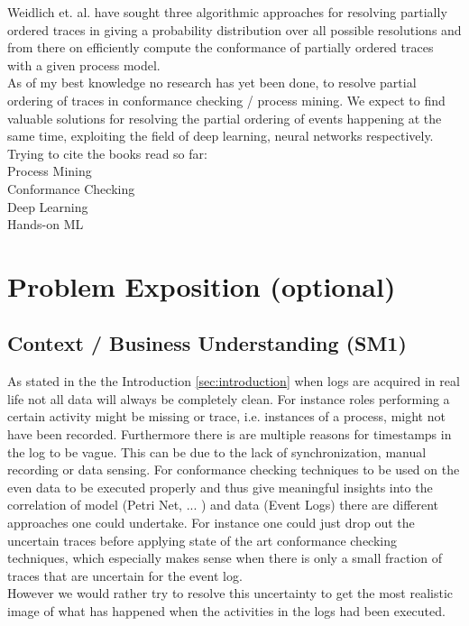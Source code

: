 \documentclass[
	a4paper,
	pagesize,
	pdftex,
	12pt,
	ngerman,
	fleqn,
	final,
	]{scrartcl}
\theoremstyle{plain}
\theoremstyle{definition}
\begin{document}
	Weidlich et. al. have sought three algorithmic approaches for resolving partially ordered traces in giving a probability distribution over all possible resolutions and from there on efficiently compute the conformance of partially ordered traces with a given process model.\cite{self} \\
	As of my best knowledge no research has yet been done, to resolve partial ordering of traces in conformance checking / process mining. We expect to find valuable solutions for resolving the partial ordering of events happening at the same time, exploiting the field of deep learning, neural networks respectively. \\
	Trying to cite the books read so far: \\
	Process Mining \cite{AalstWilvander2016Pm:d} \\ 
	Conformance Checking \cite{carmona2018conformance} \\
	Deep Learning \cite{Goodfellow-et-al-2016}\\
	Hands-on ML \cite{geron2019hands}
	
	
\section{Problem Exposition (optional)}
	
	
	\subsection{Context / Business Understanding (SM1)}
	As stated in the the Introduction \ref{sec:introduction} when logs are acquired in real life not all data will 
	always be completely clean. For instance roles performing a certain activity might be missing or trace, i.e. instances
	of a process, might not have been recorded. Furthermore there is are multiple reasons for timestamps in the log to be vague. This can be due to the lack of synchronization, manual recording or data sensing. \cite{self}
	For conformance checking techniques to be used on the even data to be executed properly and thus give meaningful insights into the correlation of model (Petri Net, ... ) and data (Event Logs) there are different approaches one could undertake. For instance one could just drop out the uncertain traces before applying state of the art conformance checking techniques, which especially makes sense when there is only a small fraction of traces that are uncertain for the event log. \\ However we would rather try to resolve this uncertainty to get the most realistic image of what has happened when the activities in the logs had been executed. 
	
\end{document}
